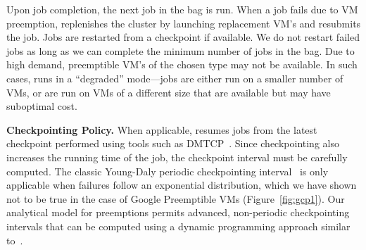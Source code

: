Upon job completion, the next job in the bag is run. 
When a job fails due to VM preemption, \sysname replenishes the cluster by launching replacement VM's and resubmits the job. 
Jobs are restarted from a checkpoint if available. 
We do not restart failed jobs as long as we can complete the minimum number of jobs in the bag.
Due to high demand, preemptible VM's of the chosen type may not be available.
In such cases, \sysname runs in a ``degraded'' mode---jobs are either run on a smaller number of VMs, or are run on VMs of a different size that are available but may have suboptimal cost.  


\noindent \textbf{Checkpointing Policy.} When applicable, \sysname resumes jobs from the latest checkpoint performed using tools such as DMTCP~\cite{dmtcp}.
Since checkpointing also increases the running time of the job, the checkpoint interval must be carefully computed. 
The classic Young-Daly periodic checkpointing interval~\cite{daly2006higher} is only applicable when failures follow an exponential distribution, which we have shown not to be true in the case of Google Preemptible VMs (Figure~\ref{fig:gcp1}). 
Our analytical model for preemptions permits advanced, non-periodic checkpointing intervals that can be computed using a dynamic programming approach similar to~\cite{bougeret_checkpointing_2011}. 

